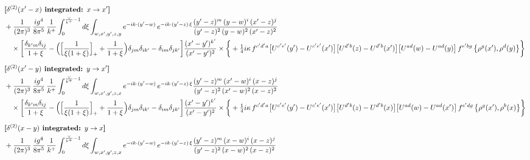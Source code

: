 \documentclass[10pt]{article}
\numberwithin{equation}{section}
\begin{document}
\begin{align}
&\textbf{[$\delta^{(2)}(x^{\prime}-x)$ integrated: $x\to x^{\prime}$]}\notag\\
&+\frac{1}{(2\pi)^{3}}\,\frac{ig^{4}}{8\pi^{5}}\,\frac{1}{k^{+}}\int_{0}^{\frac{\vee}{k^{+}}-1}d\xi\int_{w,x^{\prime},y^{\prime},z,y}e^{-ik\cdot(y^{\prime}-w)}\,e^{-ik\cdot(y^{\prime}-z)\,\xi}\frac{(y^{\prime}-z)^{m}\,(y-w)^{i}\,(x^{\prime}-z)^{j}}{(y^{\prime}-z)^{2}\,(y-w)^{2}\,(x^{\prime}-z)^{2}}\notag\\
&\quad\times\bigg[\frac{\delta_{k^{\prime}m}\delta_{ij}}{1+\xi}-\Big(\Big[\frac{1}{\xi(1+\xi)}\Big]_{+}+\frac{1}{1+\xi}\Big)\delta_{jm}\delta_{ik^{\prime}}-\delta_{im}\delta_{jk^{\prime}}\bigg]\frac{(x^{\prime}-y^{\prime})^{k^{\prime}}}{(x^{\prime}-y^{\prime})^{2}}\times\bigg\{+\tfrac14 i\kappa\,f^{c^{\prime}d^{\prime}a}\big[U^{c^{\prime}e^{\prime}}(y^{\prime})-U^{c^{\prime}e^{\prime}}(x^{\prime})\big]\big[U^{d^{\prime}b}(z)-U^{d^{\prime}b}(x^{\prime})\big]\big[U^{ad}(w)-U^{ad}(y)\big]\,f^{e^{\prime}bg}\,\big\{\rho^{g}(x^{\prime}),\rho^{d}(y)\big\}\bigg\}\notag\\[6pt]
&\textbf{[$\delta^{(2)}(x^{\prime}-y)$ integrated: $y\to x^{\prime}$]}\notag\\
&+\frac{1}{(2\pi)^{3}}\,\frac{ig^{4}}{8\pi^{5}}\,\frac{1}{k^{+}}\int_{0}^{\frac{\vee}{k^{+}}-1}d\xi\int_{w,x^{\prime},y^{\prime},z,x}e^{-ik\cdot(y^{\prime}-w)}\,e^{-ik\cdot(y^{\prime}-z)\,\xi}\frac{(y^{\prime}-z)^{m}\,(x^{\prime}-w)^{i}\,(x-z)^{j}}{(y^{\prime}-z)^{2}\,(x^{\prime}-w)^{2}\,(x-z)^{2}}\notag\\
&\quad\times\bigg[\frac{\delta_{k^{\prime}m}\delta_{ij}}{1+\xi}-\Big(\Big[\frac{1}{\xi(1+\xi)}\Big]_{+}+\frac{1}{1+\xi}\Big)\delta_{jm}\delta_{ik^{\prime}}-\delta_{im}\delta_{jk^{\prime}}\bigg]\frac{(x^{\prime}-y^{\prime})^{k^{\prime}}}{(x^{\prime}-y^{\prime})^{2}}\times\bigg\{+\tfrac14 i\kappa\,f^{c^{\prime}d^{\prime}a}\big[U^{c^{\prime}e^{\prime}}(y^{\prime})-U^{c^{\prime}e^{\prime}}(x^{\prime})\big]\big[U^{d^{\prime}b}(z)-U^{d^{\prime}b}(x)\big]\big[U^{ad}(w)-U^{ad}(x^{\prime})\big]\,f^{e^{\prime}dg}\,\big\{\rho^{g}(x^{\prime}),\rho^{b}(x)\big\}\bigg\}\notag\\[6pt]
&\textbf{[$\delta^{(2)}(x-y)$ integrated: $y\to x$]}\notag\\
&+\frac{1}{(2\pi)^{3}}\,\frac{ig^{4}}{8\pi^{5}}\,\frac{1}{k^{+}}\int_{0}^{\frac{\vee}{k^{+}}-1}d\xi\int_{w,x^{\prime},y^{\prime},z,x}e^{-ik\cdot(y^{\prime}-w)}\,e^{-ik\cdot(y^{\prime}-z)\,\xi}\frac{(y^{\prime}-z)^{m}\,(x-w)^{i}\,(x-z)^{j}}{(y^{\prime}-z)^{2}\,(x-w)^{2}\,(x-z)^{2}}\notag\\

\end{align}
\end{document}
